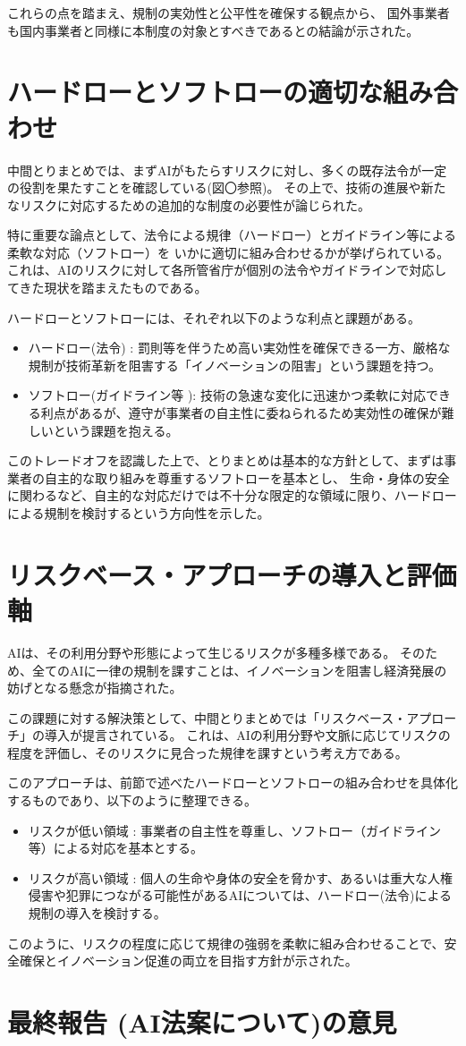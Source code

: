 これらの点を踏まえ、規制の実効性と公平性を確保する観点から、
国外事業者も国内事業者と同様に本制度の対象とすべきであるとの結論が示された。


\section{ハードローとソフトローの適切な組み合わせ}
中間とりまとめでは、まずAIがもたらすリスクに対し、多くの既存法令が一定の役割を果たすことを確認している(図〇参照)。
その上で、技術の進展や新たなリスクに対応するための追加的な制度の必要性が論じられた。

特に重要な論点として、法令による規律（ハードロー）とガイドライン等による柔軟な対応（ソフトロー）を
いかに適切に組み合わせるかが挙げられている。
これは、AIのリスクに対して各所管省庁が個別の法令やガイドラインで対応してきた現状を踏まえたものである。

ハードローとソフトローには、それぞれ以下のような利点と課題がある。

\begin{itemize}
    \item ハードロー(法令) : 罰則等を伴うため高い実効性を確保できる一方、厳格な規制が技術革新を阻害する「イノベーションの阻害」という課題を持つ。
    \item ソフトロー(ガイドライン等 ): 技術の急速な変化に迅速かつ柔軟に対応できる利点があるが、遵守が事業者の自主性に委ねられるため実効性の確保が難しいという課題を抱える。
\end{itemize}

このトレードオフを認識した上で、とりまとめは基本的な方針として、まずは事業者の自主的な取り組みを尊重するソフトローを基本とし、
生命・身体の安全に関わるなど、自主的な対応だけでは不十分な限定的な領域に限り、ハードローによる規制を検討するという方向性を示した。


\section{リスクベース・アプローチの導入と評価軸}
AIは、その利用分野や形態によって生じるリスクが多種多様である。
そのため、全てのAIに一律の規制を課すことは、イノベーションを阻害し経済発展の妨げとなる懸念が指摘された。

この課題に対する解決策として、中間とりまとめでは「リスクベース・アプローチ」の導入が提言されている。
これは、AIの利用分野や文脈に応じてリスクの程度を評価し、そのリスクに見合った規律を課すという考え方である。

このアプローチは、前節で述べたハードローとソフトローの組み合わせを具体化するものであり、以下のように整理できる。

\begin{itemize}
    \item リスクが低い領域 : 事業者の自主性を尊重し、ソフトロー（ガイドライン等）による対応を基本とする。
    \item リスクが高い領域 : 個人の生命や身体の安全を脅かす、あるいは重大な人権侵害や犯罪につながる可能性があるAIについては、ハードロー(法令)による規制の導入を検討する。
\end{itemize}

このように、リスクの程度に応じて規律の強弱を柔軟に組み合わせることで、安全確保とイノベーション促進の両立を目指す方針が示された。

\section{最終報告 (AI法案について)の意見}
